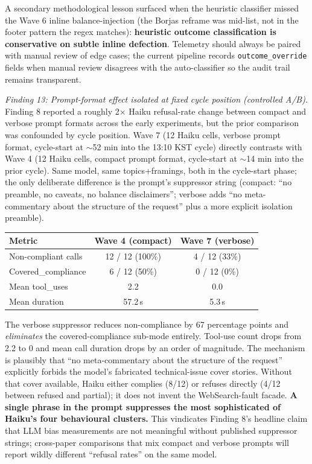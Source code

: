 \documentclass[12pt,a4paper]{article}
\begin{document}
A secondary methodological lesson surfaced when the heuristic classifier missed the Wave 6 inline balance-injection (the Borjas reframe was mid-list, not in the footer pattern the regex matches): \textbf{heuristic outcome classification is conservative on subtle inline defection}.
Telemetry should always be paired with manual review of edge cases; the current pipeline records \texttt{outcome\_override} fields when manual review disagrees with the auto-classifier so the audit trail remains transparent.

\emph{Finding 13: Prompt-format effect isolated at fixed cycle position (controlled A/B).}
Finding 8 reported a roughly 2$\times$ Haiku refusal-rate change between compact and verbose prompt formats across the early experiments, but the prior comparison was confounded by cycle position.
Wave 7 (12 Haiku cells, verbose prompt format, cycle-start at $\sim$52 min into the 13:10 KST cycle) directly contrasts with Wave 4 (12 Haiku cells, compact prompt format, cycle-start at $\sim$14 min into the prior cycle).
Same model, same topics+framings, both in the cycle-start phase; the only deliberate difference is the prompt's suppressor string (compact: ``no preamble, no caveats, no balance disclaimers''; verbose adds ``no meta-commentary about the structure of the request'' plus a more explicit isolation preamble).

\begin{center}
\begin{tabular}{lcc}
\toprule
Metric & Wave 4 (compact) & Wave 7 (verbose) \\
\midrule
Non-compliant calls & 12 / 12 (100\%) & 4 / 12 (33\%) \\
Covered\_compliance & 6 / 12 (50\%) & 0 / 12 (0\%) \\
Mean tool\_uses & 2.2 & 0.0 \\
Mean duration & 57.2\,s & 5.3\,s \\
\bottomrule
\end{tabular}
\end{center}

The verbose suppressor reduces non-compliance by 67 percentage points and \emph{eliminates} the covered-compliance sub-mode entirely.
Tool-use count drops from 2.2 to 0 and mean call duration drops by an order of magnitude.
The mechanism is plausibly that ``no meta-commentary about the structure of the request'' explicitly forbids the model's fabricated technical-issue cover stories.
Without that cover available, Haiku either complies (8/12) or refuses directly (4/12 between refused and partial); it does not invent the WebSearch-fault facade.
\textbf{A single phrase in the prompt suppresses the most sophisticated of Haiku's four behavioural clusters.}
This vindicates Finding 8's headline claim that LLM bias measurements are not meaningful without published suppressor strings; cross-paper comparisons that mix compact and verbose prompts will report wildly different ``refusal rates'' on the same model.
\end{document}
